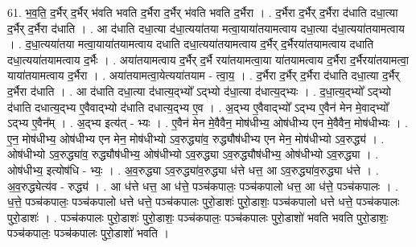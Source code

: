 \documentclass[17pt]{extarticle}
\begin{document}
61. भ॒व॒ति॒ द॒र्भैर् द॒र्भैर् भ॑वति भवति द॒र्भैरा द॒र्भैर् भ॑वति भवति द॒र्भैरा । . द॒र्भैरा द॒र्भैर् द॒र्भैरा द॑धाति दधा॒त्या द॒र्भैर् द॒र्भैरा द॑धाति । . आ द॑धाति दधा॒त्या द॑धा॒त्यया॑तया मत्वा॒याया॑तयामत्वाय दधा॒त्या द॑धा॒त्यया॑तयामत्वाय । . द॒धा॒त्यया॑तया मत्वा॒याया॑तयामत्वाय दधाति दधा॒त्यया॑तयामत्वाय द॒र्भैर् द॒र्भैरया॑तयामत्वाय दधाति दधा॒त्यया॑तयामत्वाय द॒र्भैः । . अया॑तयामत्वाय द॒र्भैर् द॒र्भै रया॑तयामत्वा॒या या॑तयामत्वाय द॒र्भैरा द॒र्भैरया॑तयामत्वा॒ याया॑तयामत्वाय द॒र्भैरा । . अया॑तयामत्वा॒येत्यया॑तयाम - त्वा॒य॒ । . द॒र्भैरा द॒र्भैर् द॒र्भैरा द॑धाति दधा॒त्या द॒र्भैर् द॒र्भैरा द॑धाति । . आ द॑धाति दधा॒त्या द॑धात्य॒द्भ्यो᳚ ऽद्भ्यो द॑धा॒त्या द॑धात्य॒द्भ्यः । . द॒धा॒त्य॒द्भ्यो᳚ ऽद्भ्यो द॑धाति दधात्य॒द्भ्य ए॒वैवाद्भ्यो द॑धाति दधात्य॒द्भ्य ए॒व । . अ॒द्भ्य ए॒वैवाद्भ्यो᳚ ऽद्भ्य ए॒वैन॑ मेन मे॒वाद्भ्यो᳚ ऽद्भ्य ए॒वैन᳚म् । . अ॒द्भ्य इत्य॑त् - भ्यः । . ए॒वैन॑ मेन मे॒वैवैन॒ मोष॑धीभ्य॒ ओष॑धीभ्य एन मे॒वैवैन॒ मोष॑धीभ्यः । . ए॒न॒ मोष॑धीभ्य॒ ओष॑धीभ्य एन मेन॒ मोष॑धीभ्यो ऽव॒रुद्ध्या॑व॒ रुद्ध्यौष॑धीभ्य एन मेन॒ मोष॑धीभ्यो ऽव॒रुद्ध्य॑ । . ओष॑धीभ्यो ऽव॒रुद्ध्या॑व॒ रुद्ध्यौष॑धीभ्य॒ ओष॑धीभ्यो ऽव॒रुद्ध्या ऽव॒रुद्ध्यौष॑धीभ्य॒ ओष॑धीभ्यो ऽव॒रुद्ध्या । . ओष॑धीभ्य॒ इत्योष॑धि - भ्यः॒ । . अ॒व॒रुद्ध्या ऽव॒रुद्ध्या॑व॒रुद्ध्या ध॑त्ते धत्त॒ आ ऽव॒रुद्ध्या॑व॒रुद्ध्या ध॑त्ते । . अ॒व॒रुद्ध्येत्य॑व - रुद्ध्य॑ । . आ ध॑त्ते धत्त॒ आ ध॑त्ते॒ पञ्च॑कपालः॒ पञ्च॑कपालो धत्त॒ आ ध॑त्ते॒ पञ्च॑कपालः । . ध॒त्ते॒ पञ्च॑कपालः॒ पञ्च॑कपालो धत्ते धत्ते॒ पञ्च॑कपालः पुरो॒डाशः॑ पुरो॒डाशः॒ पञ्च॑कपालो धत्ते धत्ते॒ पञ्च॑कपालः पुरो॒डाशः॑ । . पञ्च॑कपालः पुरो॒डाशः॑ पुरो॒डाशः॒ पञ्च॑कपालः॒ पञ्च॑कपालः पुरो॒डाशो॑ भवति भवति पुरो॒डाशः॒ पञ्च॑कपालः॒ पञ्च॑कपालः पुरो॒डाशो॑ भवति । \newline
\end{document}
